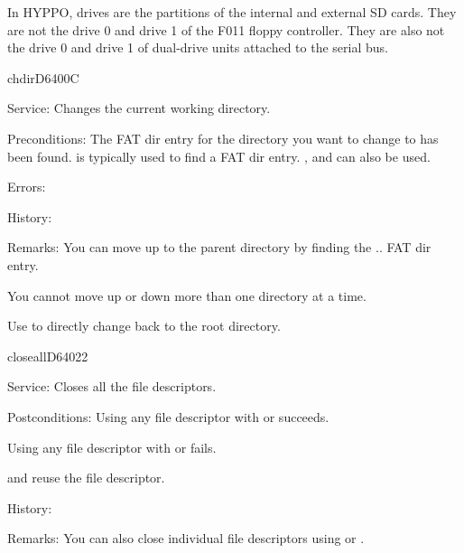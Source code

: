 In HYPPO, drives are the partitions of the internal and external SD cards.
They are not the drive 0 and drive 1 of the F011 floppy controller. They
are also not the drive 0 and drive 1 of dual-drive units attached to the serial
bus.


\begin{hyppotrap}{chdir}{D640}{0C}
\item [Service:]
  Changes the current working directory.
\item [Preconditions:]
  The FAT dir entry for the directory you want to change to has been
  found.  is typically used to find a FAT dir entry.
  ,  and  can also be
  used.
\item [Errors:]
\item [History:]
\item [Remarks:]
  You can move up to the parent directory by finding the .. FAT dir entry.

  You cannot move up or down more than one directory at a time.

  Use  to directly change back to the root directory.
\end{hyppotrap}


\newpage
\begin{hyppotrap}{closeall}{D640}{22}
\item [Service:]
  Closes all the file descriptors.
\item [Postconditions:]
  Using any file descriptor with  or 
  succeeds.

  Using any file descriptor with  or 
  fails.

   and  reuse the file descriptor.
\item [History:]
\item [Remarks:]
  You can also close individual file descriptors using  or
  .
\end{hyppotrap}


